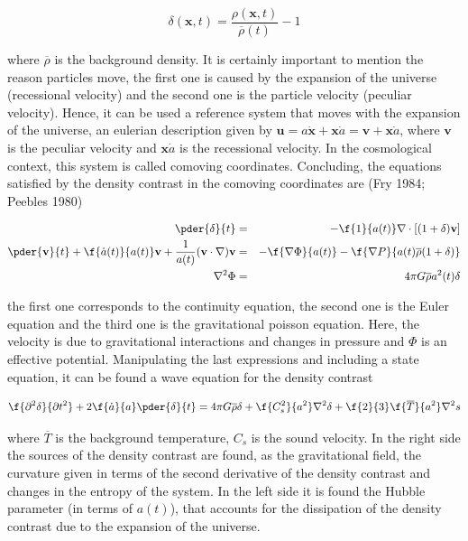 \documentclass[a4,useAMS,usegraphicx,12pt]{article}
\begin{document}
\[
\delta(\textbf{x},t) =\frac{\rho(\textbf{x},t)}{ \overline{\rho}(t) } -1 
\]

where $\overline{\rho}$ is the background density. It is certainly important to mention the reason particles move,
the first one is caused by the expansion of the universe (recessional velocity) and the second one is the particle 
velocity (peculiar velocity). Hence, it can be used a reference system that moves with the expansion of the 
universe, an eulerian description given by  $\textbf{u}= a\dot{\textbf{x}}+
\textbf{x}\dot{a} = \textbf{v}+\textbf{x}\dot{a}$, where $\textbf{v}$ is the peculiar velocity  
and $\textbf{x}\dot{a}$ is the recessional velocity. In the cosmological context, this system is called
comoving coordinates.  Concluding, the equations satisfied by the density contrast in the comoving
coordinates are (Fry 1984; Peebles 1980)


\begin{eqnarray*}
\pder{\delta}{t} &=& -\f{1}{a(t)}\nabla\cdot[(1+\delta)\textbf{v}]\nonumber\\
\pder{\textbf{v}}{t}+\f{\dot{a}(t)}{a(t)}\textbf{v}+\frac{1}{a(t)}(\textbf{v}\cdot\nabla)\textbf{v}& = &
-\f{\nabla \Phi}{a(t)}-\f{\nabla P}{a(t)\overline{\rho}(1+\delta)}\nonumber\\
\nabla^2 \Phi &=& 4\pi G\overline{\rho}a^2(t)\delta
\label{ec.movimiento}
\end{eqnarray*}

the first one corresponds to the continuity equation, the second one is the Euler equation
and the third one is the gravitational poisson equation. Here, the velocity is due to gravitational 
interactions and changes in pressure and  $\Phi$  is an effective potential. 
Manipulating the last expressions and including a state equation, it can be found a wave equation
for the density contrast

\begin{equation*}
\f{\partial^2\delta}{\partial t^2}+2\f{\dot{a}}{a}\pder{\delta}{t} =
4\pi G \overline{\rho}\delta + \f{C_s^2}{a^2}\nabla^2\delta+\f{2}{3}\f{\overline{T}}{a^2}\nabla^2s
\label{onda}
\end{equation*}

where $\overline{T}$  is the background temperature, $C_s$ is the sound velocity. In the 
right side the sources of the density contrast are found, as the gravitational field, the curvature
given in terms of the second derivative of the density contrast and changes in the entropy 
of the system. In the left side it is found the Hubble parameter (in terms of $a(t)$), that accounts
for the dissipation of the density contrast due to the expansion of the universe. 
\end{document}
